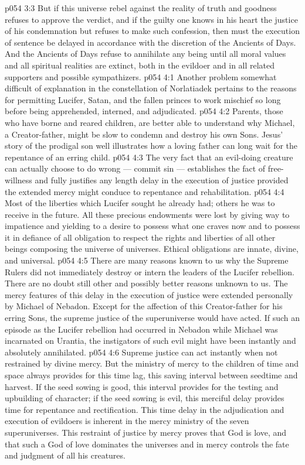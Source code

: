 \vs p054 3:3 But if this universe rebel against the reality of truth and goodness refuses to approve the verdict, and if the guilty one knows in his heart the justice of his condemnation but refuses to make such confession, then must the execution of sentence be delayed in accordance with the discretion of the Ancients of Days. And the Ancients of Days refuse to annihilate any being until all moral values and all spiritual realities are extinct, both in the evildoer and in all related supporters and possible sympathizers.
\vs p054 4:1 Another problem somewhat difficult of explanation in the constellation of Norlatiadek pertains to the reasons for permitting Lucifer, Satan, and the fallen princes to work mischief so long before being apprehended, interned, and adjudicated.
\vs p054 4:2 Parents, those who have borne and reared children, are better able to understand why Michael, a Creator\hyp{}father, might be slow to condemn and destroy his own Sons. Jesus’ story of the prodigal son well illustrates how a loving father can long wait for the repentance of an erring child.
\vs p054 4:3 The very fact that an evil\hyp{}doing creature can actually choose to do wrong --- commit sin --- establishes the fact of free\hyp{}willness and fully justifies any length delay in the execution of justice provided the extended mercy might conduce to repentance and rehabilitation.
\vs p054 4:4 \pc Most of the liberties which Lucifer sought he already had; others he was to receive in the future. All these precious endowments were lost by giving way to impatience and yielding to a desire to possess what one craves now and to possess it in defiance of all obligation to respect the rights and liberties of all other beings composing the universe of universes. Ethical obligations are innate, divine, and universal.
\vs p054 4:5 \pc There are many reasons known to us why the Supreme Rulers did not immediately destroy or intern the leaders of the Lucifer rebellion. There are no doubt still other and possibly better reasons unknown to us. The mercy features of this delay in the execution of justice were extended personally by Michael of Nebadon. Except for the affection of this Creator\hyp{}father for his erring Sons, the supreme justice of the superuniverse would have acted. If such an episode as the Lucifer rebellion had occurred in Nebadon while Michael was incarnated on Urantia, the instigators of such evil might have been instantly and absolutely annihilated.
\vs p054 4:6 Supreme justice can act instantly when not restrained by divine mercy. But the ministry of mercy to the children of time and space always provides for this time lag, this saving interval between seedtime and harvest. If the seed sowing is good, this interval provides for the testing and upbuilding of character; if the seed sowing is evil, this merciful delay provides time for repentance and rectification. This time delay in the adjudication and execution of evildoers is inherent in the mercy ministry of the seven superuniverses. This restraint of justice by mercy proves that God is love, and that such a God of love dominates the universes and in mercy controls the fate and judgment of all his creatures.

